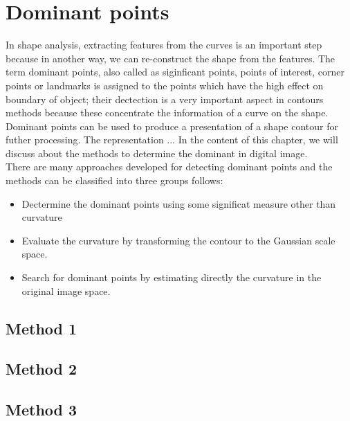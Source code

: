 \chapter{Dominant points}
In shape analysis, extracting features from the curves is an important step because in another way, we can re-construct the shape from the features. The term dominant points, also called as siginficant points, points of interest, corner points or landmarks is assigned to the points which have the high effect on boundary of object; their dectection is a very important aspect in contours methods because these concentrate the information of a curve on the shape.\\[0.2cm]
Dominant points can be used to produce a presentation of a shape contour for futher processing. The representation ...
In the content of this chapter, we will discuss about the methods to determine the dominant in digital image.\\[0.2cm]
There are many approaches developed for detecting dominant points and the methods can be classified into three groups follows:
\begin{itemize}
	\item Dectermine the dominant points using some significat measure other than curvature
	\item Evaluate the curvature by transforming the contour to the Gaussian scale space.
	\item Search for dominant points by estimating directly the curvature in the original image space.
\end{itemize}
\section{Method 1}
\section{Method 2}
\section{Method 3}